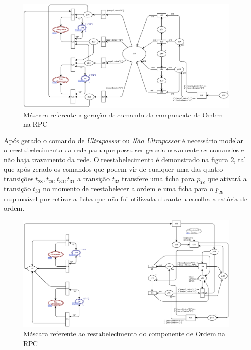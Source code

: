 \begin{figure}[ht]
    \centering
    \caption{Máscara referente a geração de comando do componente de Ordem na RPC}
    \label{fig:geracao_ordem}
    \includegraphics[width=1\linewidth]{figures/Simulation/Modelagem/geracao_ordem.eps}
\end{figure}

Após gerado o comando de \textit{Ultrapassar} ou \textit{Não Ultrapassar} é necessário modelar o reestabelecimento da rede para que possa ser gerado novamente os comandos e não haja travamento da rede. O reestabelecimento é demonstrado na figura \ref{fig:restabelecer_ordem}, tal que após gerado os comandos que podem vir de qualquer uma das quatro transições $t_{28}, t_{29}, t_{30}, t_{31}$ a transição $t_32$ transfere uma ficha para $p_{28}$ que ativará a transição $t_{33}$ no momento de reestabelecer a ordem e uma ficha para o $p_{29}$ responsável por retirar a ficha que não foi utilizada durante a escolha aleatória de ordem.

\begin{figure}[ht]
    \centering
    \caption{Máscara referente ao restabelecimento do componente de Ordem na RPC}
    \label{fig:restabelecer_ordem}
    \includegraphics[width=1\linewidth]{figures/Simulation/Modelagem/restabelecer_ordem.eps}
\end{figure}

